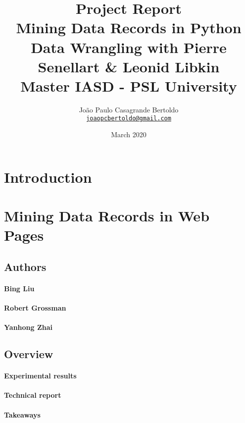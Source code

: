 \documentclass[11pt]{article}
\title{
    \huge Project Report \\ 
    Mining Data Records in Python \\ 
    \medskip
    \large Data Wrangling with Pierre Senellart \& Leonid Libkin  \\
    Master IASD - PSL University
}
\author{
    João Paulo Casagrande Bertoldo \\
    \href{mailto:joaopcbertoldo@gmail.com}{\texttt{joaopcbertoldo@gmail.com}} 
}
\date{March 2020}
\begin{document}
{
    \maketitle

    \begin{abstract}

    \end{abstract}
}


\section{Introduction}

\cite{mdr}

\cite{mdr}

\citep{mdr}

\citet{mdr}

\cite{mdr-technical}


\section{Mining Data Records in Web Pages}

\subsection{Authors}

\paragraph{Bing Liu}

\paragraph{Robert Grossman}

\paragraph{Yanhong Zhai}

\subsection{Overview}

\paragraph{Experimental results}

\paragraph{Technical report}

\paragraph{Takeaways}



\newpage
 
\end{document}
